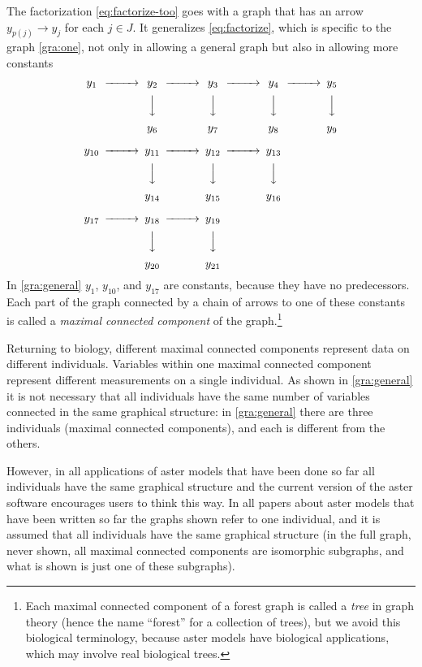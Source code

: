 \documentclass[11pt]{article}
\begin{document}
The factorization \eqref{eq:factorize-too} goes with a graph that has an
arrow $y_{p(j)} \to y_j$ for each $j \in J$.  It
generalizes \eqref{eq:factorize}, which is specific
to the graph \eqref{gra:one}, not only in allowing a general graph but also
in allowing more constants
\begin{equation} \label{gra:general}
\begin{CD}
   y_1
   @>>>
   y_2
   @>>>
   y_3
   @>>>
   y_4
   @>>>
   y_5
   \\
   @.
   @VVV
   @VVV
   @VVV
   @VVV
   \\
   \hphantom{y_1}
   @.
   y_6
   @.
   y_7
   @.
   y_8
   @.
   y_9
\\
   y_{10}
   @>>>
   y_{11}
   @>>>
   y_{12}
   @>>>
   y_{13}
   \\
   @.
   @VVV
   @VVV
   @VVV
   \\
   \hphantom{y_{10}}
   @.
   y_{14}
   @.
   y_{15}
   @.
   y_{16}
\\
   y_{17}
   @>>>
   y_{18}
   @>>>
   y_{19}
   \\
   @.
   @VVV
   @VVV
   \\
   \hphantom{y_{17}}
   @.
   y_{20}
   @.
   y_{21}
\end{CD}
\end{equation}
In \eqref{gra:general} $y_1$, $y_{10}$, and $y_{17}$ are constants,
because they have no predecessors.
Each part of the graph connected by a chain of arrows to one
of these constants is called a \emph{maximal connected component}
of the graph.\footnote{Each maximal connected component of a forest graph
is called a \emph{tree} in graph theory (hence the name ``forest'' for a
collection of trees), but we avoid this biological
terminology, because aster models have biological applications, which
may involve real biological trees.}

Returning to biology, different maximal connected
components represent data on different individuals.  Variables within one
maximal connected component represent different measurements on a single
individual.  As shown in \eqref{gra:general} it is not necessary that all
individuals have the same number of variables connected in the same graphical
structure: in \eqref{gra:general} there are three individuals (maximal
connected components), and each is different from the others.

However, in all applications of aster models that have been done so far
all individuals have the same graphical structure and the current version
of the aster software \citep{aster-package}
encourages users to think this way.  In all papers
about aster models that have been written so far the graphs shown refer
to one individual, and it is assumed that all individuals have the
same graphical structure (in the full graph, never shown, all maximal
connected components are isomorphic subgraphs, and what is shown is
just one of these subgraphs).
\end{document}
